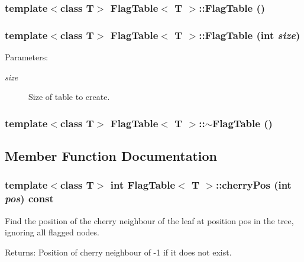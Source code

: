 \subsubsection{\setlength{\rightskip}{0pt plus 5cm}template$<$class T$>$ {\bf Flag\-Table}$<$ T $>$::{\bf Flag\-Table} ()}\label{classFlagTable_a0}


\subsubsection{\setlength{\rightskip}{0pt plus 5cm}template$<$class T$>$ {\bf Flag\-Table}$<$ T $>$::{\bf Flag\-Table} (int {\em size})}\label{classFlagTable_a1}


\begin{Desc}
\item[Parameters:]
\begin{description}
\item[{\em size}]Size of table to create. \end{description}
\end{Desc}
\subsubsection{\setlength{\rightskip}{0pt plus 5cm}template$<$class T$>$ {\bf Flag\-Table}$<$ T $>$::$\sim${\bf Flag\-Table} ()}\label{classFlagTable_a2}




\subsection{Member Function Documentation}
\subsubsection{\setlength{\rightskip}{0pt plus 5cm}template$<$class T$>$ int {\bf Flag\-Table}$<$ T $>$::cherry\-Pos (int {\em pos}) const}\label{classFlagTable_a9}


Find the position of the cherry neighbour of the leaf at position pos in the tree, ignoring all flagged nodes. 

\begin{Desc}
\item[Returns:]Position of cherry neighbour of -1 if it does not exist. \end{Desc}
